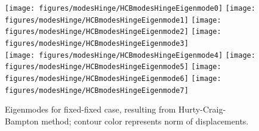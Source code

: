 \begin{figure}[tbph]
  \begin{center}
  \texttt{[image: figures/modesHinge/HCBmodesHingeEigenmode0]}
  \texttt{[image: figures/modesHinge/HCBmodesHingeEigenmode1]}
  \texttt{[image: figures/modesHinge/HCBmodesHingeEigenmode2]}
  \texttt{[image: figures/modesHinge/HCBmodesHingeEigenmode3]}\\
  \texttt{[image: figures/modesHinge/HCBmodesHingeEigenmode4]}
  \texttt{[image: figures/modesHinge/HCBmodesHingeEigenmode5]}
  \texttt{[image: figures/modesHinge/HCBmodesHingeEigenmode6]}
  \texttt{[image: figures/modesHinge/HCBmodesHingeEigenmode7]}
  \end{center}
  \caption{Eigenmodes for fixed-fixed case, resulting from Hurty-Craig-Bampton method; contour color represents norm of displacements.}
	\label{fig_hingePartFixedFixedModes}
\end{figure}


